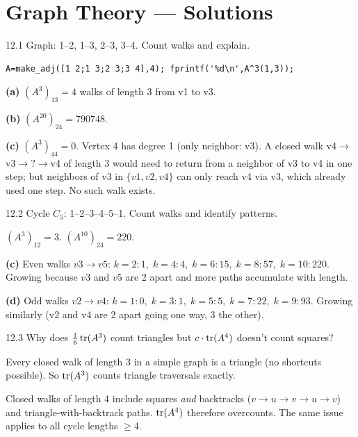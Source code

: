 \chapter{Graph Theory --- Solutions}

\begin{exercise}{12.1}
Graph: 1--2, 1--3, 2--3, 3--4. Count walks and explain.
\end{exercise}
\begin{solution}
\begin{lstlisting}
A=make_adj([1 2;1 3;2 3;3 4],4); fprintf('%d\n',A^3(1,3));
\end{lstlisting}
\textbf{(a)} $(A^3)_{13}=4$ walks of length 3 from v1 to v3.

\textbf{(b)} $(A^{20})_{24}=790748$.

\textbf{(c)} $(A^3)_{44}=0$. Vertex 4 has degree 1 (only neighbor: v3). A closed walk v4$\to$v3$\to?$$\to$v4 of length 3 would need to return from a neighbor of v3 to v4 in one step; but neighbors of v3 in $\{v1,v2,v4\}$ can only reach v4 via v3, which already used one step. No such walk exists.
\end{solution}

\begin{exercise}{12.2}
Cycle $C_5$: 1--2--3--4--5--1. Count walks and identify patterns.
\end{exercise}
\begin{solution}
$(A^3)_{12}=3$. $(A^{10})_{24}=220$.

\textbf{(c)} Even walks $v3\to v5$: $k=2:1,\;k=4:4,\;k=6:15,\;k=8:57,\;k=10:220$. Growing because $v3$ and $v5$ are 2 apart and more paths accumulate with length.

\textbf{(d)} Odd walks $v2\to v4$: $k=1:0,\;k=3:1,\;k=5:5,\;k=7:22,\;k=9:93$. Growing similarly (v2 and v4 are 2 apart going one way, 3 the other).
\end{solution}

\begin{exercise}{12.3}
Why does $\tfrac{1}{6}\operatorname{tr}(A^3)$ count triangles but $c\cdot\operatorname{tr}(A^4)$ doesn't count squares?
\end{exercise}
\begin{solution}
Every closed walk of length 3 in a simple graph is a triangle (no shortcuts possible). So $\operatorname{tr}(A^3)$ counts triangle traversals exactly.

Closed walks of length 4 include squares \textit{and} backtracks ($v\to u\to v\to u\to v$) and triangle-with-backtrack paths. $\operatorname{tr}(A^4)$ therefore overcounts. The same issue applies to all cycle lengths $\geq 4$.
\end{solution}

